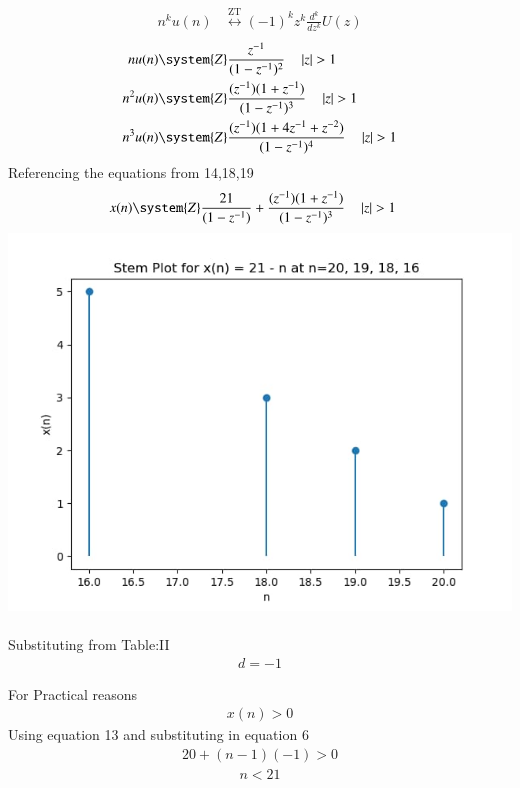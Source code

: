 \documentclass[journal,12pt,twocolumn]{IEEEtran}
\theoremstyle{remark}
\begin{document}
\begin{align}
n^k u(n) &\overset{\text{ZT}}{\longleftrightarrow} (-1)^k z^k \frac{d^k}{dz^k}U(z)
\end{align}
\begin{align}
    nu(n) &\system{Z} \frac{z^{-1}}{(1 - z^{-1})^2} \quad \abs{ z} > 1  \label{eq:3} \\
    n^2u(n) &\system{Z} \frac{(z^{-1})(1+z^{-1})}{(1 - z^{-1})^3} \quad \abs{ z} > 1  \label{eq:4} \\
    n^3u(n) &\system{Z} \frac{(z^{-1})(1+4z^{-1}+z^{-2})}{(1 - z^{-1})^4} \quad \abs{ z} > 1  \label{eq:5} 
\end{align}
Referencing the equations from 14,18,19
\begin{align}
    x(n) &\system{Z} \frac{21}{(1 - z^{-1})} +\frac{(z^{-1})(1+z^{-1})}{(1 - z^{-1})^3} \quad \abs{ z} > 1  \label{eq:3} 
\end{align}
\includegraphics[width=1\linewidth]{figs/f1.jpeg}\\\\
Substituting from Table:II
\begin{align}d=-1\end{align}
\begin{table}[h!]
        
    \end{table}
For Practical reasons 
\begin{align}x(n)>0\end{align}
Using equation 13 and substituting in equation 6
\begin{align}20+(n-1)(-1)>0\end{align}
\begin{align}n<21\end{align}
\end{document}
